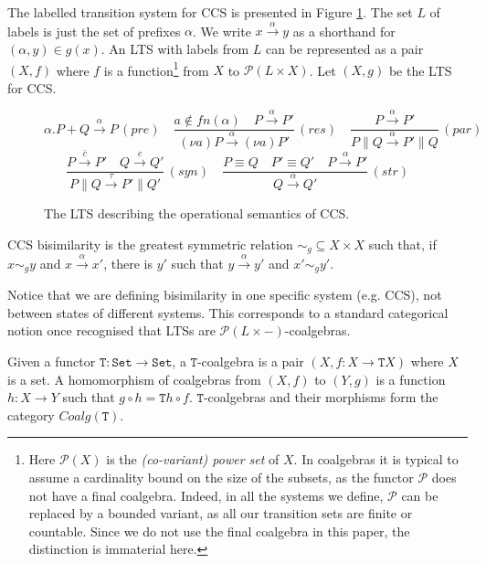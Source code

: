 \documentclass[orivec]{llncs}
\newcommand{\mC}[1]{\mathtt{#1}}
\newcommand{\mF}[1]{\mathtt{#1}}
\newcommand{\Set}{\mC{Set}}
\newcommand{\T}{\mF{T}}
\newcommand{\coalg}{\mathit{Coalg}}
\newcommand{\tr}[1]{\stackrel{#1}{\longrightarrow}}
\newcommand{\Pow}{\mathcal{P}}
\newcommand{\fn}{\mathit{fn}}
\newcommand{\defend}{}
\renewenvironment{definition}{\begin{defn}}{\defend\end{defn}}
\begin{document}
The labelled transition system for CCS is presented in Figure \ref{fig:CCS-LTS}. The set $L$ of labels is just the set of prefixes $\alpha$. We write $x \tr \alpha y$ as a shorthand for $(\alpha,y) \in g(x)$.
An LTS with labels from $L$ can be represented as a pair $(X,f)$ where $f$ is a function\footnote{Here $\Pow(X)$ is the \emph{(co-variant) power set} of $X$. In coalgebras it is typical to assume a cardinality bound on the size of the subsets, as the functor $\Pow$ does not have a final coalgebra. Indeed, in all the systems we define, $\Pow$ can be replaced by a bounded variant, as all our transition sets are finite or countable. Since we do not use the final coalgebra in this paper, the distinction is immaterial here.}
from $X$ to $\Pow(L \times X)$.  Let $(X,g)$ be the LTS for CCS.
\begin{figure}
	\begin{center}
			{\small 
				$$
			    {\alpha . P + Q \tr{\alpha} P} \,(pre)
\quad
\frac{a \notin \fn(\alpha) \quad P \tr{\alpha} P'}	  
				{(\nu a) P \tr{\alpha} (\nu a) P'} \, (res)
				\quad
\frac{P \tr{\alpha} P'}
				{P \parallel Q \tr{\alpha} P' \parallel Q} \, (par)
$$ $$
\frac{P \tr{\bar c} P' \quad Q \tr{c} Q'}
				{P \parallel Q \tr{\tau} P' \parallel Q'} \, (syn)
\quad
\frac{P \equiv Q \quad P' \equiv Q' \quad P \tr{\alpha} P'}
				{Q \tr{\alpha} Q'} \, (str)
				$$}
	\end{center}
	\caption{The LTS describing the operational semantics of CCS.}\label{fig:CCS-LTS}
\end{figure}


\begin{definition}\label{def:CCS-bisimilarity} CCS bisimilarity is the greatest symmetric relation $\sim_g \subseteq X \times X$ such that, if $x \sim_g y$ and $x \tr \alpha x'$, there is $y'$ such that $y \tr \alpha y'$ and $x' \sim_g y'$. 
\end{definition}

Notice that we are defining bisimilarity in one specific system (e.g. CCS), not between states of different systems. This corresponds to a standard categorical notion once recognised that LTSs are $\Pow(L \times -)$-coalgebras.

\begin{definition}
	Given a functor $\T : \Set \to \Set$, a $\T$-coalgebra is a pair $(X,f : X \to \T X)$ where $X$ is a set. A homomorphism of coalgebras from $(X,f)$ to $(Y,g)$ is a function $h : X \to Y$ such that $g \circ h = \T h \circ f$. $\T$-coalgebras and their morphisms form the category $\coalg(\T)$.
\end{definition}
\end{document}
